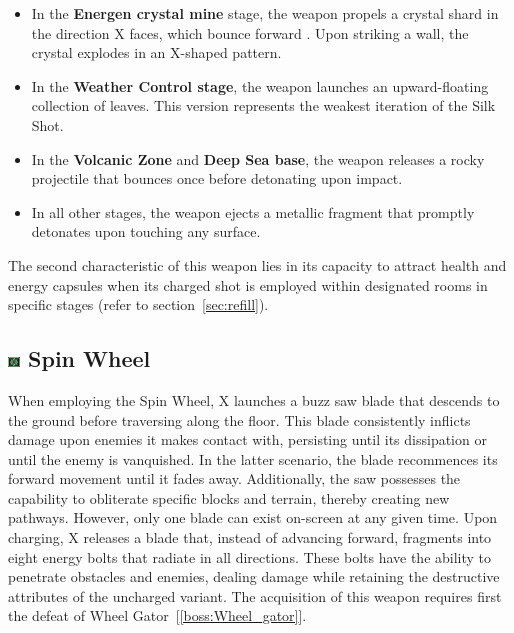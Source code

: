 \begin{itemize}
\item In the \textbf{Energen crystal mine} stage, the weapon propels a crystal shard in the direction X faces, which bounce forward . Upon striking a wall, the crystal explodes in an X-shaped pattern.
\item In the \textbf{Weather Control stage}, the weapon launches an upward-floating collection of leaves. This version represents the weakest iteration of the Silk Shot.
\item In the \textbf{Volcanic Zone} and \textbf{Deep Sea base}, the weapon releases a rocky projectile that bounces once before detonating upon impact.
\item In all other stages, the weapon ejects a metallic fragment that promptly detonates upon touching any surface.
\end{itemize}

The second characteristic of this weapon lies in its capacity to attract health and energy capsules when its charged shot is employed within designated rooms in specific stages (refer to section~\ref{sec:refill}).


\subsection{\includegraphics[width=12px, height=10px]{figures/X2/weapons/S_wheel.png} Spin Wheel}\label{Spinning_wheel}
When employing the Spin Wheel, X launches a buzz saw blade that descends to the ground before traversing along the floor. This blade consistently inflicts damage upon enemies it makes contact with, persisting until its dissipation or until the enemy is vanquished. In the latter scenario, the blade recommences its forward movement until it fades away. Additionally, the saw possesses the capability to obliterate specific blocks and terrain, thereby creating new pathways. However, only one blade can exist on-screen at any given time. Upon charging, X releases a blade that, instead of advancing forward, fragments into eight energy bolts that radiate in all directions. These bolts have the ability to penetrate obstacles and enemies, dealing damage while retaining the destructive attributes of the uncharged variant. The acquisition of this weapon requires first the defeat of Wheel Gator~[\ref{boss:Wheel_gator}].

